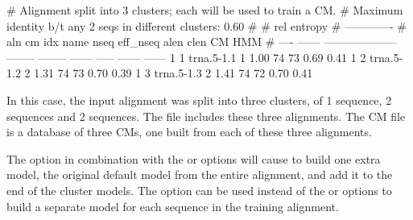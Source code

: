 \begin{sreoutput}
# Alignment split into 3 clusters; each will be used to train a CM.
# Maximum identity b/t any 2 seqs in different clusters: 0.60
#
#                                                                  rel entropy 
#                                                                 -------------
# aln  cm idx name                     nseq eff_nseq   alen  clen     CM    HMM
# ---- ------ -------------------- -------- -------- ------ ----- ------ ------
     1      1 trna.5-1.1                  1     1.00     74    73   0.69   0.41
     1      2 trna.5-1.2                  2     1.31     74    73   0.70   0.39
     1      3 trna.5-1.3                  2     1.41     74    72   0.70   0.41
\end{sreoutput}

In this case, the input alignment was split into three
clusters, of 1 sequence, 2 sequences and 2 sequences. The file
 includes these three alignments. The CM file
 is a database of three CMs, one built from
each of these three alignments. 

The  option in combination with the  or
 options will cause  to build one extra
model, the original default model from the entire alignment, and add
it to the end of the cluster models. The  option can be
used instead of the  or  options to
build a separate model for each sequence in the training alignment.

